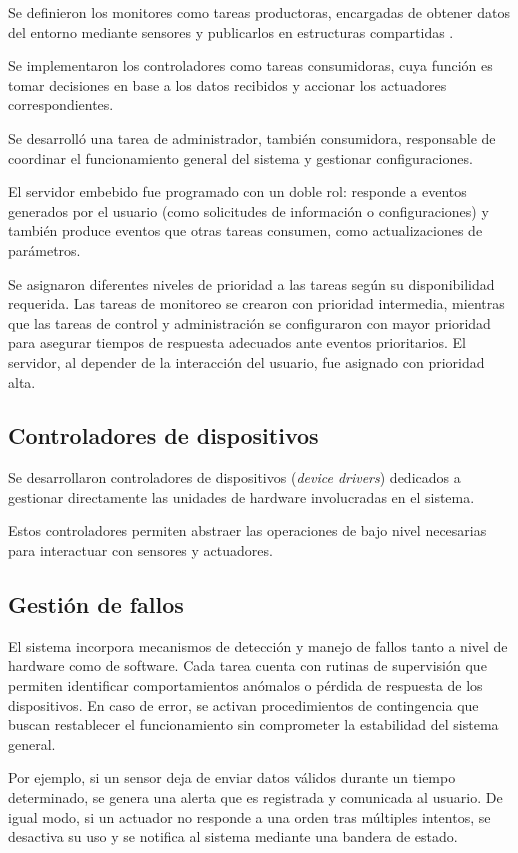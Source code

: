 Se definieron los monitores como tareas productoras, encargadas de obtener datos del entorno mediante sensores y publicarlos en estructuras compartidas .

Se implementaron los controladores como tareas consumidoras, cuya función es tomar decisiones en base a los datos recibidos y accionar los actuadores correspondientes.

Se desarrolló una tarea de administrador, también consumidora, responsable de coordinar el funcionamiento general del sistema y gestionar configuraciones.

El servidor embebido fue programado con un doble rol: responde a eventos generados por el usuario (como solicitudes de información o configuraciones) y también produce eventos que otras tareas consumen, como actualizaciones de parámetros.

Se asignaron diferentes niveles de prioridad a las tareas según su disponibilidad requerida. Las tareas de monitoreo se crearon con prioridad intermedia, mientras que las tareas de control y administración se configuraron con mayor prioridad para asegurar tiempos de respuesta adecuados ante eventos prioritarios. El servidor, al depender de la interacción del usuario, fue asignado con prioridad alta.

\subsection{Controladores de dispositivos}

Se desarrollaron controladores de dispositivos (\textit{device drivers}) dedicados a gestionar directamente las unidades de hardware involucradas en el sistema.

Estos controladores permiten abstraer las operaciones de bajo nivel necesarias para interactuar con sensores y actuadores.

\subsection{Gestión de fallos}
El sistema incorpora mecanismos de detección y manejo de fallos tanto a nivel de hardware como de software. Cada tarea cuenta con rutinas de supervisión que permiten identificar comportamientos anómalos o pérdida de respuesta de los dispositivos. En caso de error, se activan procedimientos de contingencia que buscan restablecer el funcionamiento sin comprometer la estabilidad del sistema general.

Por ejemplo, si un sensor deja de enviar datos válidos durante un tiempo determinado, se genera una alerta que es registrada y comunicada al usuario. De igual modo, si un actuador no responde a una orden tras múltiples intentos, se desactiva su uso y se notifica al sistema mediante una bandera de estado.

